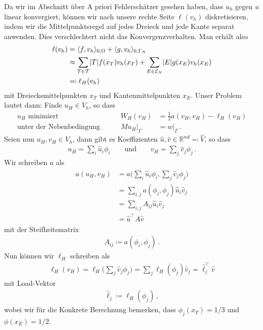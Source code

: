 \documentclass{scrartcl}
\def\R{\mathbb{R}}
\newcommand{\cE}{\mathcal{E}}
\newcommand{\cT}{\mathcal{T}}
\newcommand{\hu}{\hat{u}}
\newcommand{\hv}{\hat{v}}
\newcommand{\hV}{\hat{V}}
\newcommand{\hl}{\hat{\ell}}
\DeclarePairedDelimiter{\abs}{\lvert}{\rvert}
\DeclarePairedDelimiter{\inner}{\langle}{\rangle}
\begin{document}
Da wir im Abschnitt über A priori Fehlerschätzer gesehen haben, dass $u_h$ gegen $u$ linear konvergiert, können wir nach \cite[S.249f.]{Alb-2002} unsere rechte Seite $\ell(v_h)$ diskretisieren, indem wir die Mittelpunktsregel auf jedes Dreieck und jede Kante separat anwenden. Dies verschlechtert nicht das Konvergenzverhalten. Man erhält also
\begin{align*}
	\ell(v_h)
	&= \inner{f,v_h}_{0,\Omega}+\inner{g,v_h}_{0,\Gamma_N} \\
	&\approx \sum_{T\in\cT}\abs{T}f(x_T)v_h(x_T)+\sum_{E\in\cE_N}\abs{E}g(x_E)v_h(x_E) \\
	&\eqqcolon \ell_H(v_h)
\end{align*}
mit Dreiecksmittelpunkten $x_T$ und Kantenmittelpunkten $x_E$.
Unser Problem lautet dann: Finde $u_H\in V_h$, so dass
\begin{equation}
	\begin{aligned}
		u_H\text{ minimiert } \quad&& W_H(v_H)&=\frac{1}{2}a(v_H,v_H)-\ell_H(v_H) \\
		\text{unter der Nebenbedingung }\quad&&Mu_H\big\vert_{\Gamma} &= w\big\vert_\Gamma\,.
	\end{aligned}
	\label{eq:discretisedRHSMinimisation}
\end{equation}
Seien nun $u_H,v_H\in V_h$, dann gibt es Koeffizienten $\hu,\hv\in\R^{nd}\eqqcolon \hV$, so dass
\begin{align*}
	u_H = \sum_i\hu_i\phi_i
	\qquad\text{und}\qquad v_H = \sum_j\hv_j\phi_j\,.
\end{align*}
Wir schreiben $a$ als
\begin{align}
	\begin{aligned}
	a(u_H,v_H)
	&= a\Big(\sum_{i}\hu_i\phi_i, \sum_{j}\hv_j\phi_j\Big) \\
	&= \sum_{i,j}a(\phi_i,\phi_j)\hu_i\hv_j \\
	&= \sum_{i,j}A_{ij}\hu_i\hv_j \\
	&= \hu^\top A\hv
	\end{aligned}
	\label{eq:discretisationStiffnessMatrix}
\end{align}
mit der Steifheitsmatrix
\begin{align*}
	A_{ij} \coloneqq a(\phi_i,\phi_j)\,.
\end{align*}
Nun können wir $\ell_H$ schreiben als
\begin{align}
	\ell_H(v_H) = \ell_H\Big(\sum_j\hv_j\phi_j\Big)
	= \sum_j\ell_H(\phi_j)\hv_j
	= \hl_j^\top\hv
	\label{eq:discretisationEll}
\end{align}
mit Load-Vektor
\begin{align*}
	\hl_j\coloneqq\ell_H(\phi_j)\,,
\end{align*}
wobei wir für die Konkrete Berechnung bemerken, dass $\phi_j(x_T) = 1/3$ und $\phi(x_E)= 1/2$.
\end{document}
